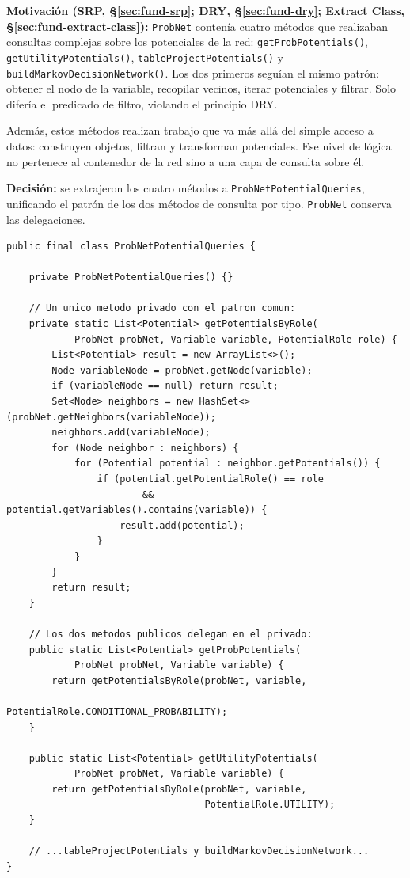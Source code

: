 \documentclass[11pt,a4paper]{article}
\newcommand{\code}[1]{\texttt{#1}}
\begin{document}
\textbf{Motivación (SRP, §\ref{sec:fund-srp}; DRY, §\ref{sec:fund-dry};
Extract Class, §\ref{sec:fund-extract-class}):}
\code{ProbNet} contenía cuatro métodos que realizaban consultas complejas
sobre los potenciales de la red: \code{getProbPotentials()},
\code{getUtilityPotentials()}, \code{tableProjectPotentials()} y
\code{buildMarkovDecisionNetwork()}.  Los dos primeros seguían el mismo
patrón: obtener el nodo de la variable, recopilar vecinos, iterar
potenciales y filtrar.  Solo difería el predicado de filtro, violando
el principio DRY.

Además, estos métodos realizan trabajo que va más allá del simple acceso
a datos: construyen objetos, filtran y transforman potenciales.  Ese
nivel de lógica no pertenece al contenedor de la red sino a una capa de
consulta sobre él.

\textbf{Decisión:} se extrajeron los cuatro métodos a
\code{ProbNetPotentialQueries}, unificando el patrón de los dos métodos
de consulta por tipo.  \code{ProbNet} conserva las delegaciones.

\begin{lstlisting}[caption={Unificación del patrón duplicado en \texttt{ProbNetPotentialQueries}.},
                   label=lst:potqueries]
public final class ProbNetPotentialQueries {

    private ProbNetPotentialQueries() {}

    // Un unico metodo privado con el patron comun:
    private static List<Potential> getPotentialsByRole(
            ProbNet probNet, Variable variable, PotentialRole role) {
        List<Potential> result = new ArrayList<>();
        Node variableNode = probNet.getNode(variable);
        if (variableNode == null) return result;
        Set<Node> neighbors = new HashSet<>(probNet.getNeighbors(variableNode));
        neighbors.add(variableNode);
        for (Node neighbor : neighbors) {
            for (Potential potential : neighbor.getPotentials()) {
                if (potential.getPotentialRole() == role
                        && potential.getVariables().contains(variable)) {
                    result.add(potential);
                }
            }
        }
        return result;
    }

    // Los dos metodos publicos delegan en el privado:
    public static List<Potential> getProbPotentials(
            ProbNet probNet, Variable variable) {
        return getPotentialsByRole(probNet, variable,
                                   PotentialRole.CONDITIONAL_PROBABILITY);
    }

    public static List<Potential> getUtilityPotentials(
            ProbNet probNet, Variable variable) {
        return getPotentialsByRole(probNet, variable,
                                   PotentialRole.UTILITY);
    }

    // ...tableProjectPotentials y buildMarkovDecisionNetwork...
}
\end{lstlisting}
\end{document}
